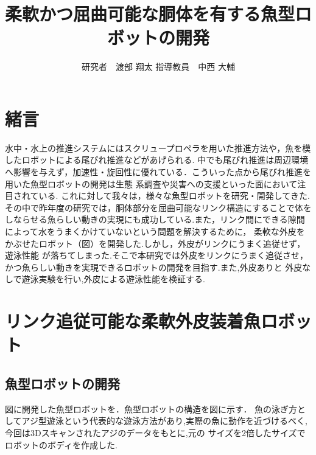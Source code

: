 \documentclass{jarticle}
\begin{document}

\title{
柔軟かつ屈曲可能な胴体を有する魚型ロボットの開発
}
\author{
研究者　渡部 翔太\;\;\;
指導教員　中西 大輔
}

\maketitle

\thispagestyle{empty}  %

\section{緒言}
水中・水上の推進システムにはスクリュープロペラを用いた推進方法や，魚を模したロボットによる尾びれ推進などがあげられる\cite{ichi}.
中でも尾びれ推進は周辺環境へ影響を与えず，加速性・旋回性に優れている．こういった点から尾びれ推進を用いた魚型ロボットの開発は生態
系調査や災害への支援といった面において注目されている\cite{ni}.
これに対して我々は，様々な魚型ロボットを研究・開発してきた.その中で昨年度の研究では，胴体部分を屈曲可能なリンク構造にすることで体を
しならせる魚らしい動きの実現にも成功している.また，リンク間にできる隙間によって水をうまくかけていないという問題を解決するために，
柔軟な外皮をかぶせたロボット（図）を開発した\cite{san}.しかし，外皮がリンクにうまく追従せず，遊泳性能
が落ちてしまった.そこで本研究では外皮をリンクにうまく追従させ，かつ魚らしい動きを実現できるロボットの開発を目指す.また,外皮ありと
外皮なしで遊泳実験を行い,外皮による遊泳性能を検証する.

\section{リンク追従可能な柔軟外皮装着魚ロボット}
\subsection{魚型ロボットの開発}
図に開発した魚型ロボットを．魚型ロボットの構造を図に示す．
魚の泳ぎ方としてアジ型遊泳という代表的な遊泳方法があり,実際の魚に動作を近づけるべく,今回は3Dスキャンされたアジのデータをもとに,元の
サイズを2倍したサイズでロボットのボディを作成した.
\end{document}
